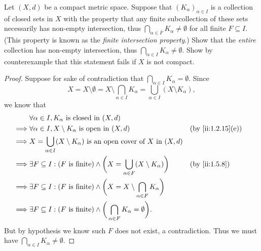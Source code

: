 \begin{ex}\label{ii:ex:1.5.15}
  Let \((X, d)\) be a compact metric space.
  Suppose that \((K_{\alpha})_{\alpha \in I}\) is a collection of closed sets in \(X\) with the property that any finite subcollection of these sets necessarily has non-empty intersection, thus \(\bigcap_{\alpha \in F} K_{\alpha} \neq \emptyset\) for all finite \(F \subseteq I\).
  (This property is known as the \emph{finite intersection property}.)
  Show that the \emph{entire} collection has non-empty intersection, thus \(\bigcap_{\alpha \in I} K_{\alpha} \neq \emptyset\).
  Show by counterexample that this statement fails if \(X\) is not compact.
\end{ex}

\begin{proof}
  Suppose for sake of contradiction that \(\bigcap_{\alpha \in I} K_\alpha = \emptyset\).
  Since
  \[
    X = X \setminus \emptyset = X \setminus \bigcap_{\alpha \in I} K_\alpha = \bigcup_{\alpha \in I} (X \setminus K_\alpha),
  \]
  we know that
  \begin{align*}
             & \forall \alpha \in I, K_\alpha \text{ is closed in } (X, d)                                                                           \\
    \implies & \forall \alpha \in I, X \setminus K_\alpha \text{ is open in } (X, d)                                             &  & \by{ii:1.2.15}[e] \\
    \implies & X = \bigcup_{\alpha \in I} (X \setminus K_\alpha) \text{ is an open cover of } X \text{ in } (X, d)                                   \\
    \implies & \exists F \subseteq I : (F \text{ is finite}) \land \bigg(X = \bigcup_{\alpha \in F} (X \setminus K_\alpha)\bigg) &  & \by{ii:1.5.8}     \\
    \implies & \exists F \subseteq I : (F \text{ is finite}) \land \bigg(X = X \setminus \bigcap_{\alpha \in F} K_\alpha\bigg)                       \\
    \implies & \exists F \subseteq I : (F \text{ is finite}) \land \bigg(\bigcap_{\alpha \in F} K_\alpha = \emptyset\bigg).
  \end{align*}
  But by hypothesis we know such \(F\) does not exist, a contradiction.
  Thus we must have \(\bigcap_{\alpha \in I} K_\alpha \neq \emptyset\).


\end{proof}
